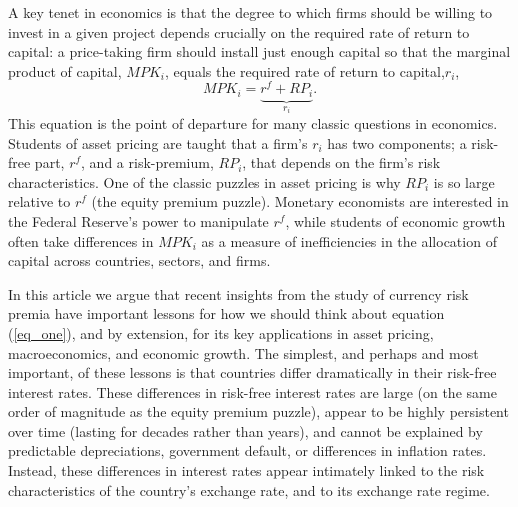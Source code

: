 \documentclass[12pt,letter]{article}
\theoremstyle{break} \theorembodyfont{\normalfont\itshape}
\theoremstyle{break}
\theoremstyle{break} \theorembodyfont{\normalfont\itshape}
\theoremstyle{break} \theorembodyfont{\normalfont\itshape}
\begin{document}
A key tenet in economics is that the degree to which firms should be
willing to invest in a given project depends crucially on the required
rate of return to capital: a price-taking firm should install just
enough capital so that the marginal product of capital, $MPK_i$, equals
the required rate of return to capital,$r_i$, 
\begin{equation}
    MPK_i=\underbrace{r^f+RP_i}_{r_i}.
    \label{eq_one}
\end{equation} 
This equation is the point of departure for many classic questions in economics. Students of asset
pricing are taught that a firm's $r_i$ has two components; a risk-free
part, $r^f$, and a risk-premium, $RP_i$, that depends on the firm's
risk characteristics. One of the classic puzzles in asset pricing is
why $RP_i$ is so large relative to $r^f$ (the equity premium puzzle).
Monetary economists are interested in the Federal Reserve's power to
manipulate $r^f$, while students of economic growth often take
differences in $MPK_i$ as a measure of inefficiencies in the
allocation of capital across countries, sectors, and firms.

In this article we argue that recent insights from the study of
currency risk premia have important lessons for how we should think
about equation (\ref{eq_one}), and by extension, for its key
applications in asset pricing, macroeconomics, and economic growth.
The simplest, and perhaps and most important, of these lessons is that
countries differ dramatically in their risk-free interest rates. These
differences in risk-free interest rates are large (on the same order
of magnitude as the equity premium puzzle), appear to be highly
persistent over time (lasting for decades rather than years), and
cannot be explained by predictable depreciations, government default,
or differences in inflation rates. Instead, these differences in
interest rates appear intimately linked to the risk characteristics of
the country's exchange rate, and to its exchange rate regime.
\end{document}
